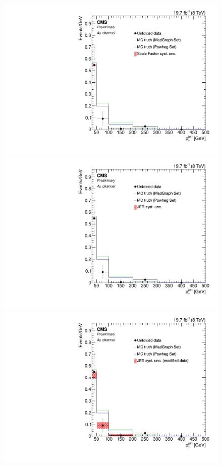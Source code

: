 \begin{figure}[hbtp]
\begin{center}
   \includegraphics[width=0.8\cmsFigWidth]{Figures/Unfolding/Systematics/ZZTo4m_PtJet1_SFSq_Mad_fr}
   \includegraphics[width=0.8\cmsFigWidth]{Figures/Unfolding/Systematics/ZZTo4m_PtJet1_JER_Mad_fr}
   \includegraphics[width=0.8\cmsFigWidth]{Figures/Unfolding/Systematics/ZZTo4m_PtJet1_JES_ModData_Mad_fr}     

\end{center}
\end{figure}
